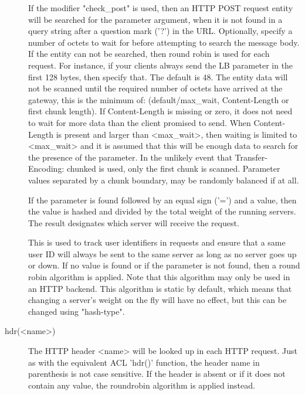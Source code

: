 \begin{description}
                  If the modifier "check\_post" is used, then an HTTP POST
                  request entity will be searched for the parameter argument,
                  when it is not found in a query string after a question mark
                  ('?') in the URL. Optionally, specify a number of octets to
                  wait for before attempting to search the message body. If the
                  entity can not be searched, then round robin is used for each
                  request. For instance, if your clients always send the LB
                  parameter in the first 128 bytes, then specify that. The
                  default is 48. The entity data will not be scanned until the
                  required number of octets have arrived at the gateway, this
                  is the minimum of: (default/max\_wait, Content-Length or first
                  chunk length). If Content-Length is missing or zero, it does
                  not need to wait for more data than the client promised to
                  send. When Content-Length is present and larger than
                  <max\_wait>, then waiting is limited to <max\_wait> and it is
                  assumed that this will be enough data to search for the
                  presence of the parameter. In the unlikely event that
                  Transfer-Encoding: chunked is used, only the first chunk is
                  scanned. Parameter values separated by a chunk boundary, may
                  be randomly balanced if at all.

                  If the parameter is found followed by an equal sign ('=') and
                  a value, then the value is hashed and divided by the total
                  weight of the running servers. The result designates which
                  server will receive the request.

                  This is used to track user identifiers in requests and ensure
                  that a same user ID will always be sent to the same server as
                  long as no server goes up or down. If no value is found or if
                  the parameter is not found, then a round robin algorithm is
                  applied. Note that this algorithm may only be used in an HTTP
                  backend. This algorithm is static by default, which means
                  that changing a server's weight on the fly will have no
                  effect, but this can be changed using "hash-type".

      \item[hdr(<name>)] The HTTP header <name> will be looked up in each HTTP
                  request. Just as with the equivalent ACL 'hdr()' function,
                  the header name in parenthesis is not case sensitive. If the
                  header is absent or if it does not contain any value, the
                  roundrobin algorithm is applied instead.


\end{description}
